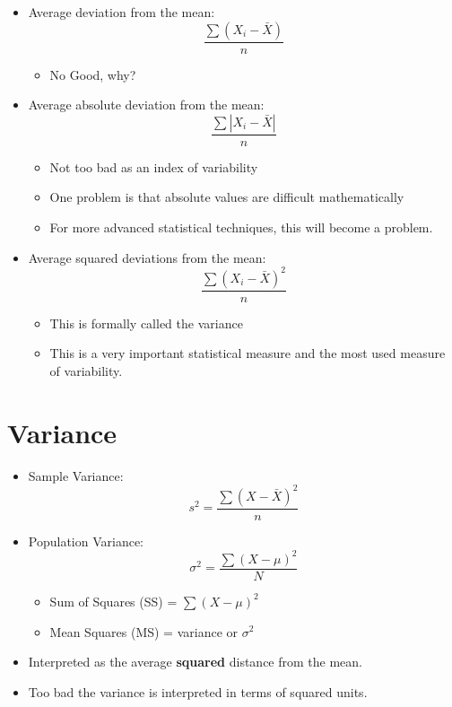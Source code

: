 \documentclass[12pt]{article}
\begin{document}
\begin{itemize}
\itemsep1pt\parskip0pt
\item
  Average deviation from the mean:
  \[ \frac{\sum (X_{i} - \bar{X})}{n} \]

  \begin{itemize}
  \itemsep1pt\parskip0pt
  \item
    No Good, why?
  \end{itemize}
\item
  Average absolute deviation from the mean:
  \[ \frac{\sum |X_{i} - \bar{X}|}{n} \]

  \begin{itemize}
  \itemsep1pt\parskip0pt
  \item
    Not too bad as an index of variability
  \item
    One problem is that absolute values are difficult mathematically
  \item
    For more advanced statistical techniques, this will become a
    problem.
  \end{itemize}
\item
  Average squared deviations from the mean:
  \[ \frac{\sum (X_{i} - \bar{X})^2}{n} \]

  \begin{itemize}
  \itemsep1pt\parskip0pt
  \item
    This is formally called the variance
  \item
    This is a very important statistical measure and the most used
    measure of variability.
  \end{itemize}
\end{itemize}

\section{Variance}\label{variance}

\begin{itemize}
\itemsep1pt\parskip0pt
\item
  Sample Variance:\\\[ s^2 = \frac{\sum (X - \bar{X})^2}{n} \]
\item
  Population Variance:\\\[ \sigma^2 = \frac{\sum (X - \mu)^2}{N} \]

  \begin{itemize}
  \itemsep1pt\parskip0pt
  \item
    Sum of Squares (SS) = \(\sum(X-\mu)^2\)
  \item
    Mean Squares (MS) = variance or \(\sigma^2\)
  \end{itemize}
\item
  Interpreted as the average \textbf{squared} distance from the mean.
\item
  Too bad the variance is interpreted in terms of squared units.
\end{itemize}
\end{document}
